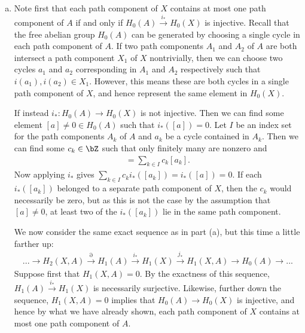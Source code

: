 \begin{homework}[e]
\begin{prf}
\begin{enumerate}[(a)]
      \item Note first that each path component of $X$ contains at most one path component of $A$ if and only if $H_0(A) \xrightarrow{i_*} H_0(X)$ is injective. Recall that the free abelian group $H_0(A)$ can be generated by choosing a single cycle in each path component of $A$. If two path components $A_1$ and $A_2$ of $A$ are both intersect a path component  $X_1$ of $X$ nontrivially, then we can choose two cycles $a_1$ and $a_2$ corresponding in $A_1$ and $A_2$ respectively such that $i(a_1),i(a_2) \in X_1$. However, this means these are both cycles in a single path component of $X$, and hence represent the same element in $H_0(X)$.

        If instead $i_*:H_0(A)\to H_0(X)$ is not injective. Then we can find some element $[a] \neq 0 \in H_0(A)$ such that $i_*([a]) = 0$. Let $I$ be an index set for the path components $A_k$ of $A$ and $a_k$ be a cycle contained in $A_k$. Then we can find some $c_k \in \bZ$ such that only finitely many are nonzero and
        \begin{align*}
          [a] = \sum_{k\in I} c_k [a_k].
        \end{align*}
        Now applying $i_*$ gives $\sum_{k\in I} c_k i_*([a_k]) = i_*([a]) = 0$. If each $i_*([a_k])$ belonged to a separate path component of $X$, then the $c_k$ would necessarily be zero, but as this is not the case by the assumption that $[a] \neq 0$, at least two of the $i_*([a_k])$ lie in the same path component.

        \bigskip

        We now consider the same exact sequence as in part (a), but this time a little farther up:
        \begin{align*}
          ...\to H_2(X,A) \xrightarrow{\partial} H_1(A) \xrightarrow{i_*} H_1(X) \xrightarrow{j_*} H_1(X,A) \to H_0(A) \to ...
        \end{align*}
        Suppose first that $H_1(X,A) = 0$. By the exactness of this sequence, $H_1(A) \xrightarrow{i_*} H_1(X)$ is necessarily surjective. Likewise, further down the sequence, $H_1(X,A) = 0$ implies that $H_0(A) \to H_0(X)$ is injective, and hence by what we have already shown, each path component of $X$ contains at most one path component of $A$.


\end{enumerate}
\end{prf}
\end{homework}
